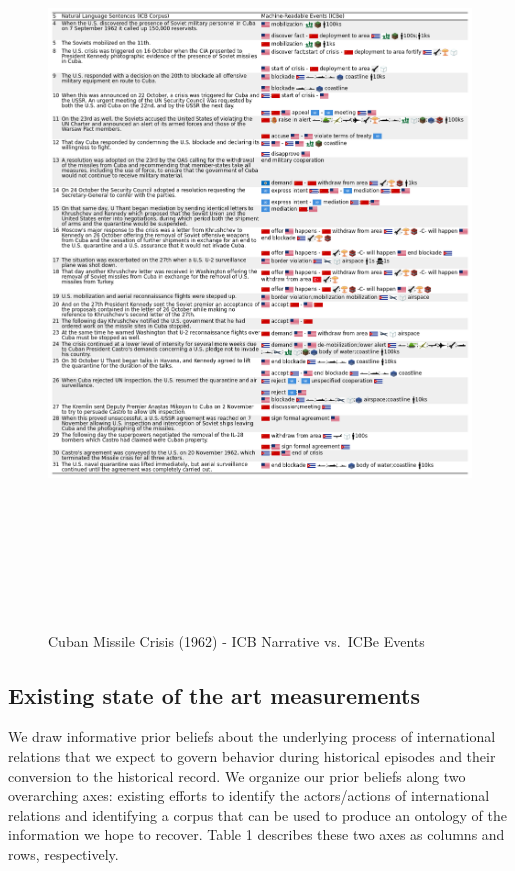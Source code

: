 \documentclass{article}
\begin{document}
\begin{figure}
\hypertarget{fig-cubanarrative}{%
\centering
\includegraphics[width=7in,height=8in]{case_study_cuban_precision.png}
\caption{Cuban Missile Crisis (1962) - ICB Narrative vs.~ICBe
Events}\label{fig-cubanarrative}
}
\end{figure}

\hypertarget{existing-state-of-the-art-measurements}{%
\subsection{Existing state of the art
measurements}\label{existing-state-of-the-art-measurements}}

We draw informative prior beliefs about the underlying process of
international relations that we expect to govern behavior during
historical episodes and their conversion to the historical record. We
organize our prior beliefs along two overarching axes: existing efforts
to identify the actors/actions of international relations and
identifying a corpus that can be used to produce an ontology of the
information we hope to recover. Table 1 describes these two axes as
columns and rows, respectively.
\end{document}
